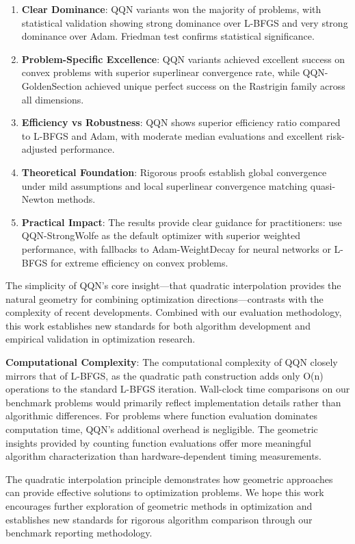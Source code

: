 \begin{enumerate}
\def\labelenumi{\arabic{enumi}.}
\item
  \textbf{Clear Dominance}: QQN variants won the majority of problems, with statistical validation showing strong dominance over L-BFGS and very strong dominance over Adam. Friedman test confirms statistical significance.
\item
  \textbf{Problem-Specific Excellence}: QQN variants achieved excellent success on convex problems with superior superlinear convergence rate, while QQN-GoldenSection achieved unique perfect success on the Rastrigin family across all dimensions.
\item
  \textbf{Efficiency vs Robustness}: QQN shows superior efficiency ratio compared to L-BFGS and Adam, with moderate median evaluations and excellent risk-adjusted performance.
\item
  \textbf{Theoretical Foundation}: Rigorous proofs establish global convergence under mild assumptions and local superlinear convergence matching quasi-Newton methods.
\item
  \textbf{Practical Impact}: The results provide clear guidance for practitioners: use QQN-StrongWolfe as the default optimizer with superior weighted performance, with fallbacks to Adam-WeightDecay for neural networks or L-BFGS for extreme efficiency on convex problems.
\end{enumerate}

The simplicity of QQN's core insight---that quadratic interpolation provides the natural geometry for combining optimization directions---contrasts with the complexity of recent developments.
Combined with our evaluation methodology, this work establishes new standards for both algorithm development and empirical validation in optimization research.

\textbf{Computational Complexity}: The computational complexity of QQN closely mirrors that of L-BFGS, as the quadratic path construction adds only O(n) operations to the standard L-BFGS iteration.
Wall-clock time comparisons on our benchmark problems would primarily reflect implementation details rather than algorithmic differences.
For problems where function evaluation dominates computation time, QQN's additional overhead is negligible.
The geometric insights provided by counting function evaluations offer more meaningful algorithm characterization than hardware-dependent timing measurements.

The quadratic interpolation principle demonstrates how geometric approaches can provide effective solutions to optimization problems.
We hope this work encourages further exploration of geometric methods in optimization and establishes new standards for rigorous algorithm comparison through our benchmark reporting methodology.

